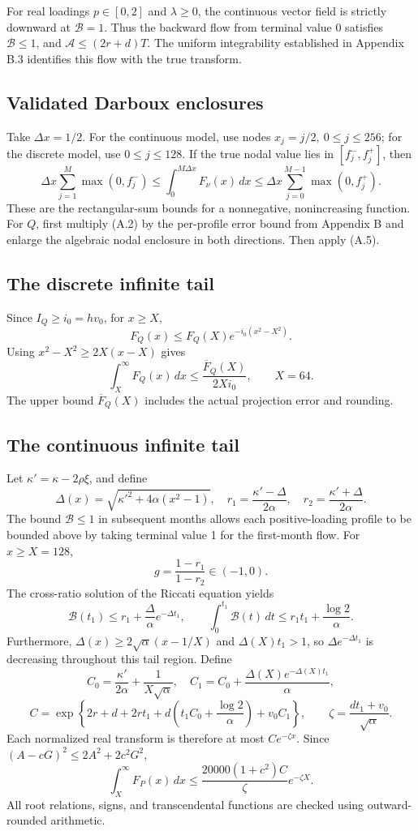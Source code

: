 \documentclass[11pt,a4paper]{article}
\begin{document}
For real loadings \(p\in[0,2]\) and \(\lambda\ge0\), the continuous vector field is strictly downward at \(\mathcal B=1\). Thus the backward flow from terminal value 0 satisfies \(\mathcal B\le1\), and \(\mathcal A\le(2r+d)T\). The uniform integrability established in Appendix B.3 identifies this flow with the true transform.

\subsection{Validated Darboux enclosures}

Take \(\Delta x=1/2\). For the continuous model, use nodes \(x_j=j/2,\ 0\le j\le256\); for the discrete model, use \(0\le j\le128\). If the true nodal value lies in \([f_j^-,f_j^+]\), then
\[
\Delta x\sum_{j=1}^{M}\max(0,f_j^-)
\le\int_0^{M\Delta x}F_\nu(x)\,dx
\le\Delta x\sum_{j=0}^{M-1}\max(0,f_j^+).
\tag{A.5}
\]
These are the rectangular-sum bounds for a nonnegative, nonincreasing function. For \(Q\), first multiply (A.2) by the per-profile error bound from Appendix B and enlarge the algebraic nodal enclosure in both directions. Then apply (A.5).

\subsection{The discrete infinite tail}

Since \(I_Q\ge i_0=hv_0\), for \(x\ge X\),
\[
F_Q(x)\le F_Q(X)e^{-i_0(x^2-X^2)}.
\]
Using \(x^2-X^2\ge2X(x-X)\) gives
\[
\int_X^\infty F_Q(x)\,dx\le\frac{\overline F_Q(X)}{2Xi_0},
\qquad X=64.
\tag{A.6}
\]
The upper bound \(\overline F_Q(X)\) includes the actual projection error and rounding.

\subsection{The continuous infinite tail}

Let \(\kappa'=\kappa-2\rho\xi\), and define
\[
\Delta(x)=\sqrt{\kappa'^2+4\alpha(x^2-1)},\quad
r_1=\frac{\kappa'-\Delta}{2\alpha},\quad
r_2=\frac{\kappa'+\Delta}{2\alpha}.
\]
The bound \(\mathcal B\le1\) in subsequent months allows each positive-loading profile to be bounded above by taking terminal value 1 for the first-month flow. For \(x\ge X=128\),
\[
g=\frac{1-r_1}{1-r_2}\in(-1,0).
\]
The cross-ratio solution of the Riccati equation yields
\[
\mathcal B(t_1)\le r_1+\frac{\Delta}{\alpha}e^{-\Delta t_1},
\qquad
\int_0^{t_1}\mathcal B(t)\,dt
\le r_1t_1+\frac{\log2}{\alpha}.
\tag{A.7}
\]
Furthermore, \(\Delta(x)\ge2\sqrt\alpha(x-1/X)\) and \(\Delta(X)t_1>1\), so \(\Delta e^{-\Delta t_1}\) is decreasing throughout this tail region. Define
\[
C_0=\frac{\kappa'}{2\alpha}+\frac1{X\sqrt\alpha},\quad
C_1=C_0+\frac{\Delta(X)e^{-\Delta(X)t_1}}{\alpha},
\]
\[
C=\exp\!\left\{2r+d+2rt_1+
d\left(t_1C_0+\frac{\log2}{\alpha}\right)+v_0C_1\right\},
\qquad \zeta=\frac{dt_1+v_0}{\sqrt\alpha}.
\]
Each normalized real transform is therefore at most \(Ce^{-\zeta x}\). Since \((A-cG)^2\le2A^2+2c^2G^2\),
\[
\int_X^\infty F_P(x)\,dx
\le \frac{20000(1+c^2)C}{\zeta}e^{-\zeta X}.
\tag{A.8}
\]
All root relations, signs, and transcendental functions are checked using outward-rounded arithmetic.
\end{document}
